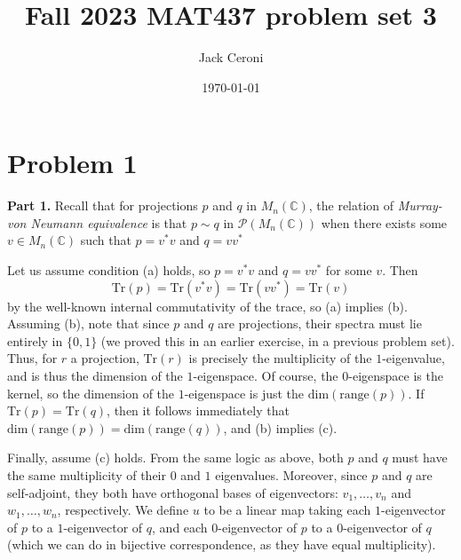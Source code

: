 \documentclass[aps,pra,showpacs,notitlepage,onecolumn,superscriptaddress,nofootinbib]{revtex4-1}
\newcommand{\hhrulefill}{\hspace{-1.0em}\hrulefill}
\theoremstyle{definition}
\begin{document}
\title{Fall 2023 MAT437 problem set 3}
\author{Jack Ceroni}

\date{\today}

\maketitle

\hhrulefill

\section{Problem 1}

\noindent \textbf{Part 1.} Recall that for projections $p$ and $q$ in $M_n(\mathbb{C})$, the relation of \emph{Murray-von Neumann equivalence} is that $p \sim q$ in $\mathcal{P}(M_n(\mathbb{C}))$ when there exists some $v \in M_n(\mathbb{C})$ such that $p = v^{*} v$ and $q = v v^{*}$
\newline

\noindent Let us assume condition (a) holds, so $p = v^{*} v$ and $q = v v^{*}$ for some $v$. Then
\begin{equation}
  \text{Tr}(p) = \text{Tr}(v^{*} v) = \text{Tr}(v v^{*}) = \text{Tr}(v)
\end{equation}
by the well-known internal commutativity of the trace, so (a) implies (b). Assuming (b), note that since $p$ and $q$ are projections, their spectra must lie entirely in $\{0, 1\}$ (we proved this in an earlier exercise, in a previous problem set).
Thus, for $r$ a projection, $\text{Tr}(r)$ is precisely the multiplicity of the $1$-eigenvalue, and is thus the dimension of the $1$-eigenspace. Of course, the $0$-eigenspace is the kernel, so the dimension of the $1$-eigenspace is just the $\text{dim}(\text{range}(p))$.
If $\text{Tr}(p) = \text{Tr}(q)$, then it follows immediately that $\text{dim}(\text{range}(p)) = \text{dim}(\text{range}(q))$, and (b) implies (c).

Finally, assume (c) holds. From the same logic as above, both $p$ and $q$ must have the same multiplicity of their $0$ and $1$ eigenvalues. Moreover, since $p$ and $q$ are self-adjoint, they both have orthogonal bases of eigenvectors: $v_1, \dots, v_n$
and $w_1, \dots, w_n$, respectively. We define $u$ to be a linear map taking each $1$-eigenvector of $p$ to a $1$-eigenvector of $q$, and each $0$-eigenvector of $p$ to a $0$-eigenvector of $q$ (which we can do in bijective correspondence, as they have equal multiplicity).
\end{document}
